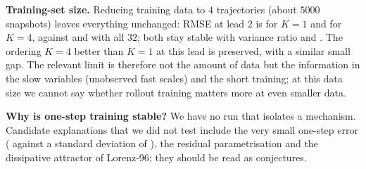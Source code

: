 \textbf{Training-set size.} Reducing training data to $4$ trajectories (about $5000$ snapshots) leaves everything unchanged: RMSE at lead 2 is  for $K{=}1$ and  for $K{=}4$, against  and  with all $32$; both stay stable with variance ratio  and . The ordering $K{=}4$ better than $K{=}1$ at this lead is preserved, with a similar small gap. The relevant limit is therefore not the amount of data but the information in the slow variables (unobserved fast scales) and the short training; at this data size we cannot say whether rollout training matters more at even smaller data.

\textbf{Why is one-step training stable?} We have no run that isolates a mechanism. Candidate explanations that we did not test include the very small one-step error ( against a standard deviation of ), the residual parametrisation and the dissipative attractor of Lorenz-96; they should be read as conjectures.
